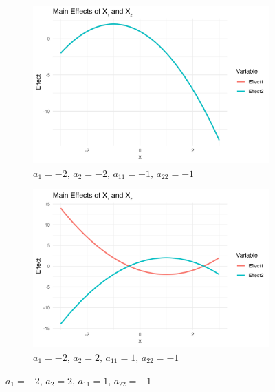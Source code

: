 \begin{figure}[htpb]
    \centering
    \begin{subfigure}[t]{0.49\textwidth}
        \centering
        \includegraphics[width=\textwidth]{images/mixed_a1m20_a2m20_a11m10_a22m10_a12p00_rhop00_main.png}
        \caption{$a_1=-2,\, a_2=-2,\, a_{11}=-1,\, a_{22}=-1$}
        \label{fig:mixed_rho_0_panel1}
    \end{subfigure}%
    \hfill
    \begin{subfigure}[t]{0.49\textwidth}
        \centering
        \includegraphics[width=\textwidth]{images/mixed_a1m20_a2p20_a11p10_a22m10_a12p00_rhop00_main.png}
        \caption{$a_1=-2,\, a_2=2,\, a_{11}=1,\, a_{22}=-1$}
        \label{fig:mixed_rho_0_panel2}
    \end{subfigure}


\end{figure}
